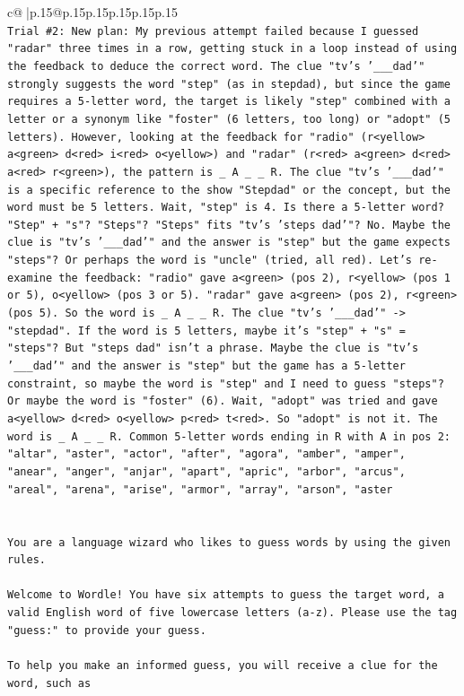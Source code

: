 \documentclass{article}
\begin{document}
{\begin{supertabular}{c@{$\;$}|p{.15\linewidth}@{}p{.15\linewidth}p{.15\linewidth}p{.15\linewidth}p{.15\linewidth}p{.15\linewidth}}
{{{\\ 
\texttt{Trial \#2: New plan: My previous attempt failed because I guessed "radar" three times in a row, getting stuck in a loop instead of using the feedback to deduce the correct word. The clue "tv's '\_\_\_dad'" strongly suggests the word "step" (as in stepdad), but since the game requires a 5{-}letter word, the target is likely "step" combined with a letter or a synonym like "foster" (6 letters, too long) or "adopt" (5 letters). However, looking at the feedback for "radio" (r<yellow> a<green> d<red> i<red> o<yellow>) and "radar" (r<red> a<green> d<red> a<red> r<green>), the pattern is \_ A \_ \_ R. The clue "tv's '\_\_\_dad'" is a specific reference to the show "Stepdad" or the concept, but the word must be 5 letters. Wait, "step" is 4. Is there a 5{-}letter word? "Step" + "s"? "Steps"? "Steps" fits "tv's 'steps dad'"? No. Maybe the clue is "tv's '\_\_\_dad'" and the answer is "step" but the game expects "steps"? Or perhaps the word is "uncle" (tried, all red). Let's re{-}examine the feedback: "radio" gave a<green> (pos 2), r<yellow> (pos 1 or 5), o<yellow> (pos 3 or 5). "radar" gave a<green> (pos 2), r<green> (pos 5). So the word is \_ A \_ \_ R. The clue "tv's '\_\_\_dad'" {-}> "stepdad". If the word is 5 letters, maybe it's "step" + "s" = "steps"? But "steps dad" isn't a phrase. Maybe the clue is "tv's '\_\_\_dad'" and the answer is "step" but the game has a 5{-}letter constraint, so maybe the word is "step" and I need to guess "steps"? Or maybe the word is "foster" (6). Wait, "adopt" was tried and gave a<yellow> d<red> o<yellow> p<red> t<red>. So "adopt" is not it. The word is \_ A \_ \_ R. Common 5{-}letter words ending in R with A in pos 2: "altar", "aster", "actor", "after", "agora", "amber", "amper", "anear", "anger", "anjar", "apart", "apric", "arbor", "arcus", "areal", "arena", "arise", "armor", "array", "arson", "aster} \\
\\ 
\\ 
\texttt{You are a language wizard who likes to guess words by using the given rules.} \\
\\ 
\texttt{Welcome to Wordle! You have six attempts to guess the target word, a valid English word of five lowercase letters (a{-}z). Please use the tag "guess:" to provide your guess.} \\
\\ 
\texttt{To help you make an informed guess, you will receive a clue for the word, such as} \\
}}}
\end{supertabular}}
\end{document}
